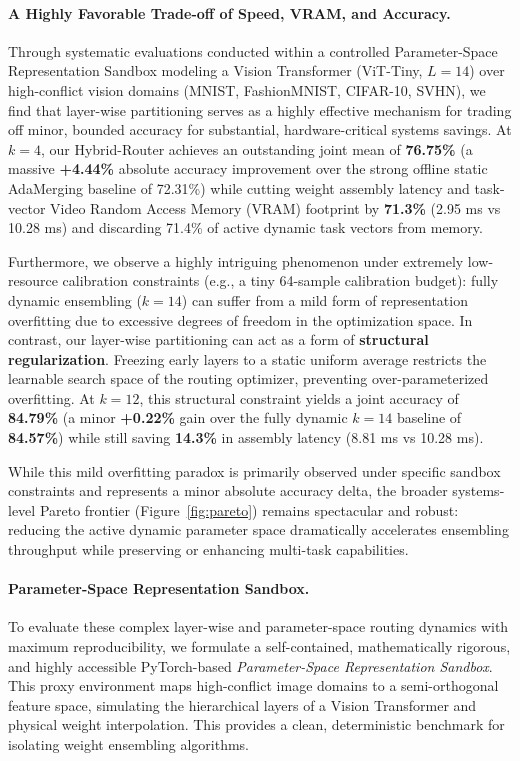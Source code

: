 \paragraph{A Highly Favorable Trade-off of Speed, VRAM, and Accuracy.}
Through systematic evaluations conducted within a controlled Parameter-Space Representation Sandbox modeling a Vision Transformer (ViT-Tiny, $L=14$) over high-conflict vision domains (MNIST, FashionMNIST, CIFAR-10, SVHN), we find that layer-wise partitioning serves as a highly effective mechanism for trading off minor, bounded accuracy for substantial, hardware-critical systems savings. 
At $k=4$, our Hybrid-Router achieves an outstanding joint mean of \textbf{76.75\%} (a massive \textbf{+4.44\%} absolute accuracy improvement over the strong offline static AdaMerging baseline of 72.31\%) while cutting weight assembly latency and task-vector Video Random Access Memory (VRAM) footprint by \textbf{71.3\%} (2.95 ms vs 10.28 ms) and discarding 71.4\% of active dynamic task vectors from memory.

Furthermore, we observe a highly intriguing phenomenon under extremely low-resource calibration constraints (e.g., a tiny 64-sample calibration budget): fully dynamic ensembling ($k=14$) can suffer from a mild form of representation overfitting due to excessive degrees of freedom in the optimization space. In contrast, our layer-wise partitioning can act as a form of \textbf{structural regularization}. Freezing early layers to a static uniform average restricts the learnable search space of the routing optimizer, preventing over-parameterized overfitting. At $k=12$, this structural constraint yields a joint accuracy of \textbf{84.79\%} (a minor \textbf{+0.22\%} gain over the fully dynamic $k=14$ baseline of \textbf{84.57\%}) while still saving \textbf{14.3\%} in assembly latency (8.81 ms vs 10.28 ms). 

While this mild overfitting paradox is primarily observed under specific sandbox constraints and represents a minor absolute accuracy delta, the broader systems-level Pareto frontier (Figure~\ref{fig:pareto}) remains spectacular and robust: reducing the active dynamic parameter space dramatically accelerates ensembling throughput while preserving or enhancing multi-task capabilities.

\paragraph{Parameter-Space Representation Sandbox.}
To evaluate these complex layer-wise and parameter-space routing dynamics with maximum reproducibility, we formulate a self-contained, mathematically rigorous, and highly accessible PyTorch-based \emph{Parameter-Space Representation Sandbox}. This proxy environment maps high-conflict image domains to a semi-orthogonal feature space, simulating the hierarchical layers of a Vision Transformer and physical weight interpolation. This provides a clean, deterministic benchmark for isolating weight ensembling algorithms.

